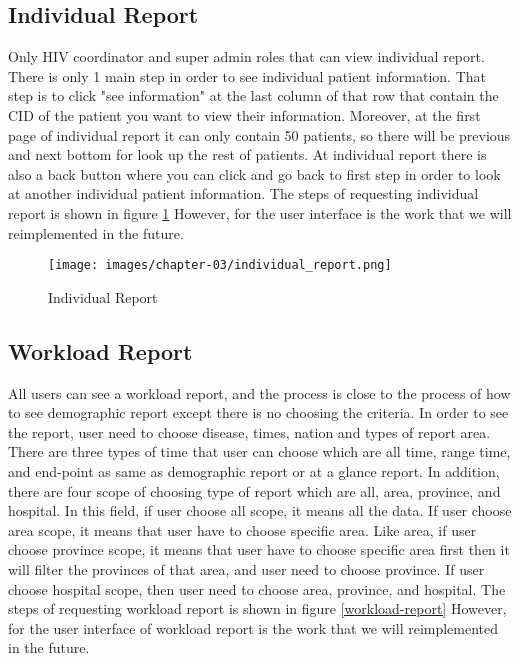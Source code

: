  	\subsection{Individual Report}
 	\label{individual_report_activity_diagram}
 	Only HIV coordinator and super admin roles that can view individual report. There is only 1 main step in order to see individual patient information. That step is to click "see information" at the last column of that row that contain the CID of the patient you want to view their information. Moreover, at the first page of individual report it can only contain 50 patients, so there will be previous and next bottom for look up the rest of patients. At individual report there is also a back button where you can click and go back to first step in order to look at another individual patient information. The steps of requesting individual report is shown in figure \ref{individual-report} However, for the user interface is the work that we will reimplemented in the future.
 	
 	\FloatBarrier
     	\begin{figure}[h!]
            \centering
         		\texttt{[image: images/chapter-03/individual\_report.png]}
         		\caption{Individual Report}
        		\label{individual-report}
        \end{figure}
 	\FloatBarrier

 	\subsection{Workload Report}
 	\label{workload_report_activity_diagram}
 	All users can see a workload report, and the process is close to the process of how to see demographic report except there is no choosing the criteria. In order to see the report, user need to choose disease, times, nation and types of report area. There are three types of time that user can choose which are all time, range time, and end-point as same as demographic report or at a glance report. In addition, there are four scope of choosing type of report which are all, area, province, and hospital. In this field, if user choose all scope, it means all the data. If user choose area scope, it means that user have to choose specific area. Like area, if user choose province scope, it means that user have to choose specific area first then it will filter the provinces of that area, and user need to choose province. If user choose hospital scope, then user need to choose area, province, and hospital. The steps of requesting workload report is shown in figure \ref{workload-report} However, for the user interface of workload report is the work that we will reimplemented in the future.
 	
